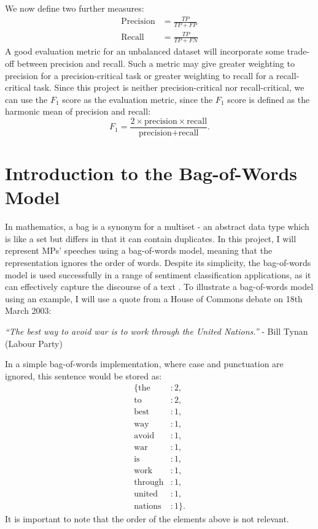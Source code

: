 \documentclass[12pt,a4paper,twoside,openright]{report}
\begin{document}
\newline
\newline
We now define two further measures:
\begin{align}
	\text{Precision} & = \frac{TP}{TP + FP} \\
	\text{Recall} & = \frac{TP}{TP + FN}
\end{align}
A good evaluation metric for an unbalanced dataset will incorporate some trade-off between precision and recall. Such a metric may give greater weighting to precision for a precision-critical task or greater weighting to recall for a recall-critical task. Since this project is neither precision-critical nor recall-critical, we can use the $F_1$ score as the evaluation metric, since the $F_1$ score is defined as the harmonic mean of precision and recall:
\begin{equation}
	F_1 = \frac{2 \times \text{precision} \times \text{recall}}{\text{precision} + \text{recall}}.
\end{equation}
\section{Introduction to the Bag-of-Words Model} \label{prep-bow}

In mathematics, a bag is a synonym for a multiset - an abstract data type which is like a set but differs in that it can contain duplicates. In this project, I will represent MPs' speeches using a bag-of-words model, meaning that the representation ignores the order of words. Despite its simplicity, the bag-of-words model is used successfully in a range of sentiment classification applications, as it can effectively capture the discourse of a text \cite{nlp_book}.
\newline
\newline
To illustrate a bag-of-words model using an example, I will use a quote from a House of Commons debate on 18th March 2003:
\begin{center}
	\textit{``The best way to avoid war is to work through the United Nations.''}
	\newline
	 - Bill Tynan (Labour Party)
\end{center}
In a simple bag-of-words implementation, where case and punctuation are ignored, this sentence would be stored as:
\begin{align*}
	\{\text{the}&: 2,\\ \text{to}&: 2,\\ \text{best}&: 1,\\ \text{way}&: 1,\\ \text{avoid}&: 1,\\ \text{war}&: 1,\\ \text{is}&: 1,\\ \text{work}&: 1,\\ \text{through}&: 1,\\ \text{united}&: 1,\\ \text{nations}&: 1\}.
\end{align*}
It is important to note that the order of the elements above is not relevant.
\end{document}
